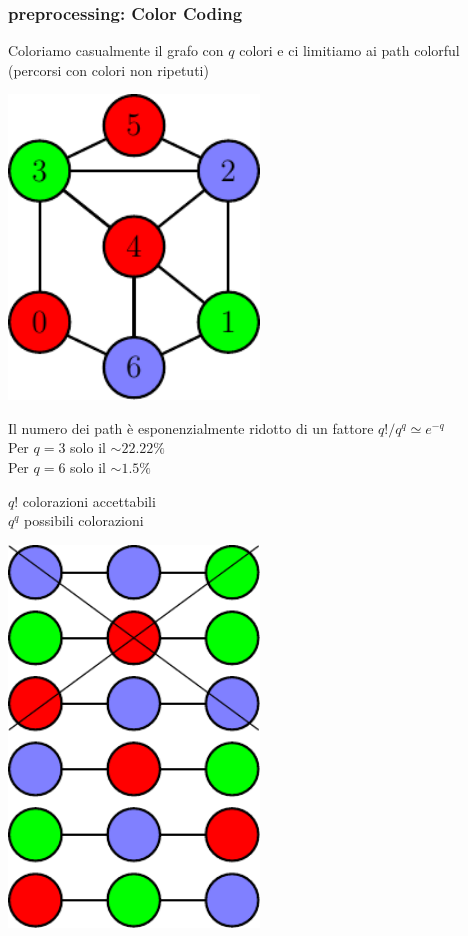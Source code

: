 \begin{frame}
	\frametitle{preprocessing: Color Coding}
	\centering

	\pause

		\begin{minipage}{.45\textwidth}
			\centering
			Coloriamo casualmente il grafo con $q$ colori e ci limitiamo ai path colorful 
			(percorsi con colori non ripetuti)
			\medskip
			
			\includegraphics[width=0.5\textwidth]{images/8_cc_graph}
			
			\small
			\medskip
			
			Il numero dei path è esponenzialmente ridotto di un fattore $q! / q^q \simeq e^{-q}$\\
			 
			Per $q=3$ solo il $\sim22.22\%$\\
			Per $q=6$ solo il $\sim1.5\%$\phantom{$22$}
		\end{minipage}\hfill
		\pause
		\begin{minipage}{.45\textwidth}
			\centering
			
			\small
			
			$q!$ colorazioni accettabili\\
			$q^q$ possibili colorazioni
			
			\medskip
			
			\includegraphics[width=0.5\textwidth]{images/8_cc_list}
			

\end{minipage}
\end{frame}
